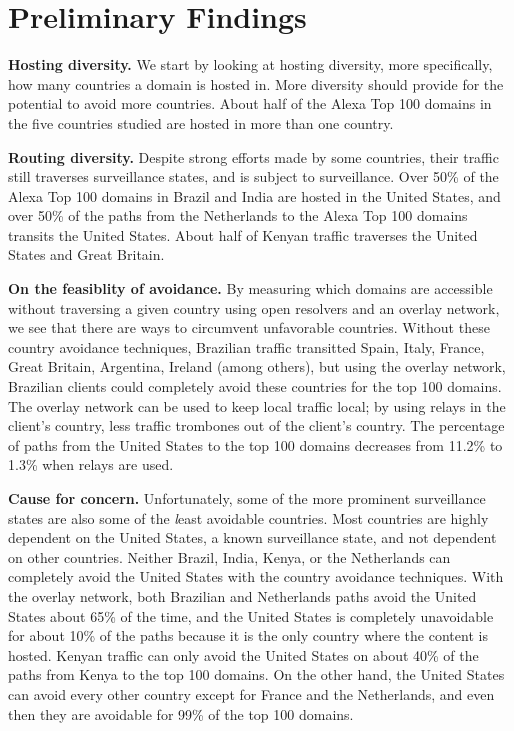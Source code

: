 \section{Preliminary Findings}

{\bf Hosting diversity.} We start by looking at hosting diversity, more specifically, how many
countries a domain is hosted in.  More diversity should provide for the
potential to avoid more countries.  About half of the
Alexa Top 100 domains in the five countries studied are hosted in more
than one country. 

{\bf Routing diversity.} Despite strong efforts made by some countries,
their traffic still traverses surveillance states, and is
subject to surveillance.  Over 50\% of the Alexa Top 100 domains in
Brazil and India are hosted in the United States, and over 50\% of the
paths from the Netherlands to the Alexa Top 100 domains transits the
United States.  About half of Kenyan traffic traverses the United States
and Great Britain.   

{\bf On the feasiblity of avoidance.} By measuring which domains are accessible without traversing a given
country using open resolvers and an overlay network, we see that
there are ways to circumvent unfavorable countries.  Without these
country avoidance techniques, Brazilian traffic transitted Spain, Italy,
France, Great Britain, Argentina, Ireland (among others), but using the
overlay network, Brazilian clients could completely avoid these
countries for the top 100 domains.  The overlay network can be used to
keep local traffic local; by using relays in the client's country, less
traffic trombones out of the client's country.  The percentage of paths
from the United States to the top 100 domains decreases from 11.2\% to 1.3\% when
relays are used.   

{\bf Cause for concern.} Unfortunately, some of the more prominent surveillance states are also
some of the {\textit least avoidable} countries.  Most countries are
highly dependent on the United States, a known surveillance state, and
not dependent on other countries.  Neither Brazil, India, Kenya, or the
Netherlands can completely avoid the United States with the country
avoidance techniques.  With the overlay network, both Brazilian and
Netherlands paths avoid the United States about 65\% of the time, and
the United States is completely unavoidable for about 10\% of the paths
because it is the only country where the content is hosted.  Kenyan traffic can
only avoid the United States on about 40\% of the paths from Kenya to
the top 100 domains.  On the other hand, the United States can avoid
every other country except for France and the Netherlands, and even then
they are avoidable for 99\% of the top 100 domains.   


